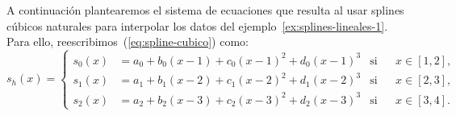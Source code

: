  \begin{example}
   \label{ex:splines-cubicos}
   A continuación plantearemos el sistema de ecuaciones que resulta al
   usar splines cúbicos naturales para
   interpolar los datos del ejemplo~\ref{ex:splines-lineales-1}. Para
   ello, reescribimos~(\ref{eq:spline-cubico}) como:
   \begin{equation*}
     s_h(x)=\left\{
       \begin{aligned}
         s_0(x)&=a_0 + b_0(x-1) + c_0(x-1)^2 + d_0(x-1)^3 
         & \text{si} && x\in[1,2],
         \\
         s_1(x)&=a_1 + b_1(x-2) + c_1(x-2)^2 + d_1(x-2)^3 
         &\text{si}&& x\in[2,3],
         \\
         s_2(x)&=a_2 + b_2(x-3) + c_2(x-3)^2 + d_2(x-3)^3 
         & \text{si}&& x\in[3,4].
       \end{aligned}\right.
   \end{equation*}
 \end{example}

